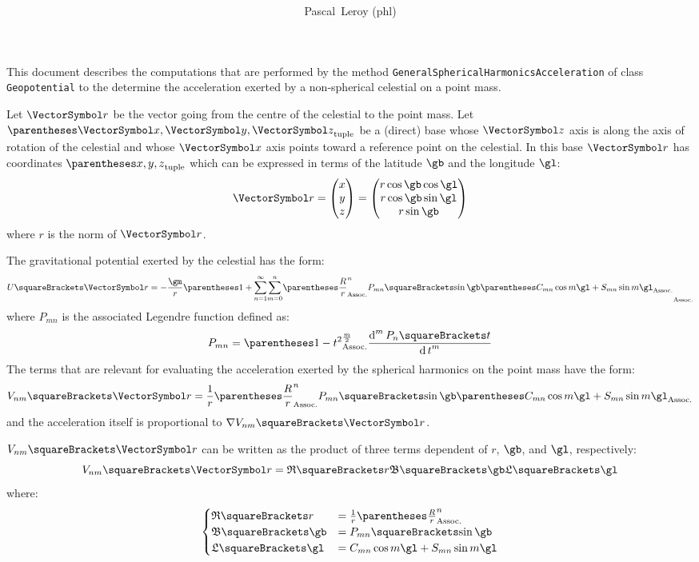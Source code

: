 \documentclass[10pt, a4paper, oneside]{basestyle}
\title{%
\textdisplay{%
Geopotential%
}%
}
\author{Pascal~Leroy (phl)}
\begin{document}
\maketitle
\noindent
This document describes the computations that are performed by the method \texttt{GeneralSphericalHarmonicsAcceleration} of class \texttt{Geopotential} to the determine the acceleration exerted by a non-spherical celestial on a point mass.

Let $\vr$ be the vector going from the centre of the celestial to the point mass.  Let $\tuple{\vx, \vy, \vz}$ be a (direct) base whose $\vz$ axis is along the axis of rotation of the celestial and whose $\vx$ axis points toward a reference point on the celestial.  In this base $\vr$ has coordinates $\tuple{x, y, z}$ which can be expressed in terms of the latitude $\gb$ and the longitude $\gl$:
\begin{equation*}
\vr=\begin{pmatrix}
x \\ y \\ z
\end{pmatrix}
=\begin{pmatrix}
r \cos \gb \cos \gl\\
r \cos \gb \sin \gl\\
r \sin \gb
\end{pmatrix}
\end{equation*}
where $r$ is the norm of $\vr$.

The gravitational potential exerted by the celestial has the form:
\begin{equation*}
U\of\vr = -\frac{\gm}{r}\pa{1 + \sum{n = 1}[\infty] \sum{m = 0}[n] 
\pa{\frac{R}{r}}^n P_{m n}\of{\sin \gb}
\pa{C_{m n} \cos m \gl + S_{m n} \sin m \gl}
}
\end{equation*}
where $P_{m n}$ is the associated Legendre function defined as:
\begin{equation*}
P_{m n} = \pa{1 - t^2}^{\frac{m}{2}} \deriv[m] t {P_n\of t}
\end{equation*}
The terms that are relevant for evaluating the acceleration exerted by the spherical harmonics on the point mass have the form:
\begin{equation*}
V_{n m}\of\vr = \frac{1}{r}\pa{\frac{R}{r}}^n P_{m n}\of{\sin \gb}
\pa{C_{m n} \cos m \gl + S_{m n} \sin m \gl}
\end{equation*}
and the acceleration itself is proportional to $\grad V_{n m}\of\vr$.

$V_{n m}\of\vr$ can be written as the product of three terms dependent of $r$, $\gb$, and $\gl$, respectively:
\begin{equation*}
V_{n m}\of\vr = {\mathfrak R\of r} {\mathfrak B\of \gb} {\mathfrak L\of \gl}
\end{equation*}
where:
\begin{equation*}
\begin{cases}
\mathfrak R\of r &= \frac{1}{r}\pa{\frac{R}{r}}^n\\
\mathfrak B\of \gb &= P_{m n}\of{\sin \gb}\\
\mathfrak L\of \gl &= C_{m n} \cos m \gl + S_{m n} \sin m \gl
\end{cases}
\end{equation*}
\end{document}
